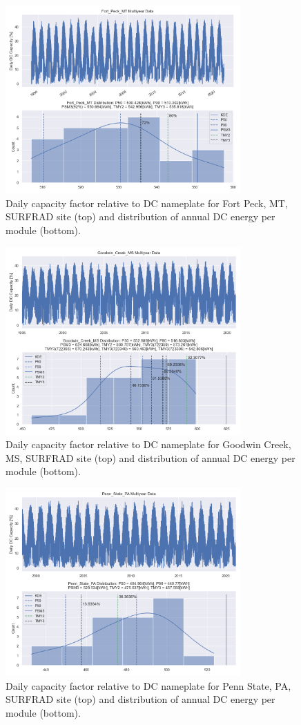 \documentclass[conference]{IEEEtran}
\begin{document}
\begin{figure}[htbp]
\centerline{\includegraphics[width=9cm]{Fort_Peck_MT.png}}
\caption{Daily capacity factor relative to DC nameplate for Fort Peck, MT, SURFRAD site (top) and distribution of annual DC energy per module (bottom).}
\label{fig:Fort-Peck-MT}
\end{figure}

\begin{figure}[htbp]
\centerline{\includegraphics[width=9cm]{Goodwin_Creek_MS.png}}
\caption{Daily capacity factor relative to DC nameplate for Goodwin Creek, MS, SURFRAD site (top) and distribution of annual DC energy per module (bottom).}
\label{fig:Goodwin-Creek-MS}
\end{figure}

\begin{figure}[htbp]
\centerline{\includegraphics[width=9cm]{Penn_State_PA.png}}
\caption{Daily capacity factor relative to DC nameplate for Penn State, PA, SURFRAD site (top) and distribution of annual DC energy per module (bottom).}
\label{fig:Penn-State-PA}
\end{figure}
\end{document}
